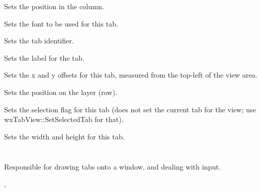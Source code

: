 
Sets the position in the column.



Sets the font to be used for this tab.



Sets the tab identifier.



Sets the label for the tab.



Sets the x and y offsets for this tab, measured from the top-left of the view area.



Sets the position on the layer (row).



Sets the selection flag for this tab (does not set the current tab for the view;
use wxTabView::SetSelectedTab for that).



Sets the width and height for this tab.

\section{}\label{wxtabview}

Responsible for drawing tabs onto a window, and dealing with input.




, 

